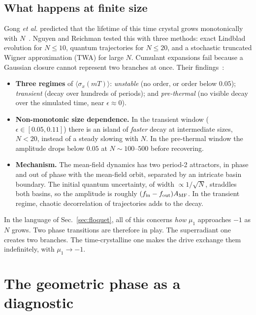 \documentclass[11pt,a4paper]{article}
\newcommand{\ev}[1]{\langle #1\rangle}
\begin{document}
\subsection{What happens at finite size}\label{sec:finiteN}

Gong \emph{et al.} predicted that the lifetime of this time crystal grows monotonically with
$N$~\cite{gong2018}. Nguyen and Reichman tested this with three methods: exact Lindblad
evolution for $N\le10$, quantum trajectories for $N\le20$, and a stochastic truncated Wigner
approximation (TWA) for large $N$. Cumulant expansions fail because a Gaussian closure cannot
represent two branches at once. Their findings~\cite{nguyen2026}:
\begin{itemize}
\item \textbf{Three regimes} of $\ev{\sigma_x(mT)}$: \emph{unstable} (no order, or order below
  $0.05$); \emph{transient} (decay over hundreds of periods); and \emph{pre-thermal} (no visible
  decay over the simulated time, near $\epsilon\approx0$).
\item \textbf{Non-monotonic size dependence.} In the transient window
  ($\epsilon\in[0.05,0.11]$) there is an island of \emph{faster} decay at intermediate sizes,
  $N<20$, instead of a steady slowing with $N$. In the pre-thermal window the amplitude drops
  below $0.05$ at $N\sim100$–$500$ before recovering.
\item \textbf{Mechanism.} The mean-field dynamics has two period-2 attractors, in phase and out
  of phase with the mean-field orbit, separated by an intricate basin boundary. The initial
  quantum uncertainty, of width $\propto1/\sqrt N$, straddles both basins, so the amplitude is
  roughly $(f_{\rm in}-f_{\rm out})A_{\rm MF}$. In the transient regime, chaotic decorrelation of
  trajectories adds to the decay.
\end{itemize}
In the language of Sec.~\ref{sec:floquet}, all of this concerns \emph{how} $\mu_1$ approaches
$-1$ as $N$ grows. Two phase transitions are therefore in play. The superradiant one creates
two branches. The time-crystalline one makes the drive exchange them indefinitely, with
$\mu_1\to-1$.

\section{The geometric phase as a diagnostic}\label{sec:gp}
\end{document}
